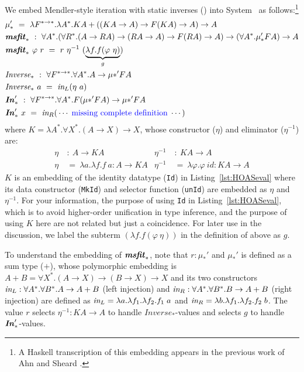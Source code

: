 We embed Mendler-style iteration with static inverses (\msfit{*})
into System \Fw\ as follows:\footnote{A Haskell transcription of this embedding
	appears in the previous work of Ahn and Sheard \cite{AhnShe11}.}
\begin{align*}
&\mu_{*}' ~=~ \lambda F^{* \to *}.\lambda A^{*}.
		K A + ((K A \to A) \to F(K A) \to A) \to A
	\\
&\textbf{\textit{msfit}}_{*} ~:~ \forall A^{*}.
	(\forall R^{*}.(A \to R A) \to (R A \to A) \to F(R A) \to A) \to
	(\forall A^{*}.\mu_{*}' F A) \to A \\
&\textbf{\textit{msfit}}_{*}~\varphi~r ~=~ r~\eta^{-1}~(\underbrace{\lambda f.f(\varphi~\eta)}_g)
	\\
&\textit{Inverse}_{*} ~:~ \forall F^{*\to*}.\forall A^{*}.A \to \mu{*}' F A \\
&\textit{Inverse}_{*}~a ~=~ \textit{in}_{L} (\eta~a)
	\\
&\textbf{\textit{In}}_{*}' ~:~ \forall F^{*\to*}.\forall A^{*}.F(\mu{*}' F A) \to \mu{*}' F A \\
&\textbf{\textit{In}}_{*}'~x ~=~ \textit{in}_{R}(\,\cdots\;\text{\color{blue}missing complete definition}\;\cdots)
\end{align*}
where $K = \lambda A^{*}.\forall X^{*}.(A \to X) \to X$,
whose constructor ($\eta$) and eliminator ($\eta^{-1}$) are:
\begin{align*}
\eta &~:~ A \to KA &
\eta^{-1} &~:~ KA \to A \\
\eta &~=~ \lambda a.\lambda f.f~a : A \to KA &
\eta^{-1} &~=~ \lambda \varphi.\varphi~\textit{id} : KA \to A
\end{align*}
$K$ is an embedding of the identity datatype (\lstinline{Id})
in Listing~\ref{lst:HOASeval} where its data constructor (\lstinline{MkId}) and
selector function (\lstinline{unId}) are embedded as $\eta$ and $\eta^{-1}$.
For your information, the purpose of using \lstinline{Id}
in Listing~\ref{lst:HOASeval}, which is to avoid higher-order unification
in type inference, and the purpose of using $K$ here are not related but
just a coincidence. For later use in the discussion, we label the subterm
$(\lambda f.f(\varphi~\eta))$ in the definition of \msfit{*} above as $g$.

To understand the embedding of $\textbf{\textit{msfit}}_{*}$, note that $r : \mu_{*}'$ and
$\mu_{*}'$ is defined as a sum type ($+$), whose polymorphic embedding is
$A + B = \forall X^{*}.(A \to X) \to (B \to X) \to X$ and its two constructors
$\textit{in}_{L} : \forall A^{*}.\forall B^{*}.A \to A + B$ (left injection) and
$\textit{in}_{R} : \forall A^{*}.\forall B^{*}.B \to A + B$ (right injection) are
defined as $\textit{in}_{L} = \lambda a.\lambda f_1.\lambda f_2.f_1\;a$ and
$\textit{in}_{R} = \lambda b.\lambda f_1.\lambda f_2.f_2\;b$. The value $r$ selects
$\eta^{-1} : KA \to A$ to handle $\textit{Inverse}_{*}$-values and selects
$g$ to handle $\textbf{\textit{In}}_{*}'$-values.

